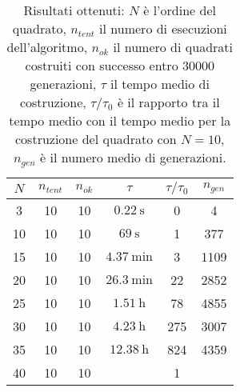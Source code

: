 \documentclass[italian,twoside,twocolumn]{article}
\begin{document}
\begin{table}[htbp]
	\centering
	\caption{Risultati ottenuti: $ N $ è l'ordine del quadrato, $ n_{tent} $ il numero di esecuzioni dell'algoritmo, $ n_{ok} $ il numero di quadrati costruiti con successo entro $ \num{30000} $ generazioni, $ \tau $ il tempo medio di costruzione, $ \tau \slash \tau_0 $ è il rapporto tra il tempo medio con il tempo medio per la costruzione del quadrato con $ N = 10 $, $ n_{gen} $ è il numero medio di generazioni.}
	\begin{tabular}{c|ccccc}
		\hline
		$ N $ & $ n_{tent} $ & $ n_{ok} $ &        $ \tau $        & $ \tau \slash \tau_0 $ & $ n_{gen} $ \\ \hline
		  3   &      10      &     10     & $ \SI{0.22}{\second} $ &           0            &      4      \\
		 10   &      10      &     10     &  $ \SI{69}{\second} $  &           1            &     377     \\
		 15   &      10      &     10     & $ \SI{4.37}{\minute} $ &           3            &    1109     \\
		 20   &      10      &     10     & $ \SI{26.3}{\minute} $ &           22           &    2852     \\
		 25   &      10      &     10     &  $ \SI{1.51}{\hour} $  &          78            &    4855     \\
		 30   &      10      &     10     &  $ \SI{4.23}{\hour} $  &          275           &    3007     \\
		 35   &      10      &     10     & $ \SI{12.38}{\hour} $  &          824           &    4359     \\
		 40   &      10      &     10     &                        &           1            &  \\ \hline
	\end{tabular} 
	\label{tab:risultati_xie_kang_10}
\end{table}
\end{document}
